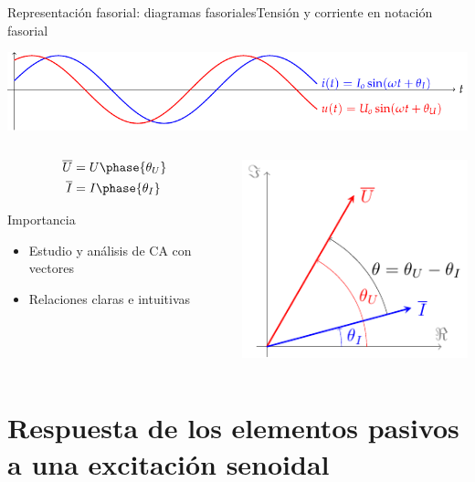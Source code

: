 \documentclass[aspectratio=169, xcolor={usenames,svgnames,dvipsnames}]{beamer}
\begin{document}
\begin{frame}{Representación fasorial: diagramas fasoriales}{Tensión y corriente en notación fasorial} 
\begin{center}
\includegraphics[width=.9\linewidth]{../figs/ondasTensionCorriente.pdf}
\end{center}

\begin{columns}
\begin{column}{0.5\columnwidth}
\begin{align*}
  \overline{U} &= U\phase{\theta_U}\\
  \overline{I} &= I\phase{\theta_I}
\end{align*}
\begin{block}{Importancia}
 \begin{itemize}
     \item Estudio y análisis de CA con vectores
     \item Relaciones claras e intuitivas
 \end{itemize}
\end{block}
\end{column}

\begin{column}{0.5\columnwidth}
\begin{center}
\includegraphics[height=0.5\textheight]{../figs/fasorTensionCorriente.pdf}
\end{center}
\end{column}
\end{columns}
\end{frame}

\section{Respuesta de los elementos pasivos a una excitación senoidal}
\end{document}
